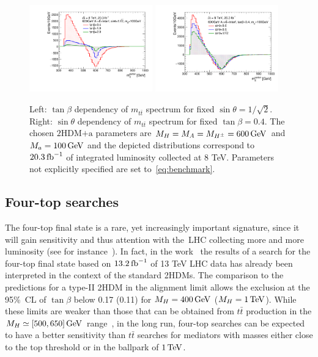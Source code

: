 \documentclass[a4paper, 11pt,notoc]{article}
\newcommand{\mA}{\ensuremath{M_{A}}\xspace}
\newcommand{\ma}{\ensuremath{M_{a}}\xspace}
\newcommand{\mH}{\ensuremath{M_{H}}\xspace}
\newcommand{\mHc}{\ensuremath{M_{H^{\pm}}}\xspace}
\newcommand{\hdma}{\ensuremath{\textrm{2HDM+a}}\xspace}
\begin{document}
\begin{figure}
\centering
\includegraphics[width=0.475\textwidth]{ttres_2HDMa_A_tanb.pdf} \quad 
\includegraphics[width=0.475\textwidth]{ttres_2HDMa_A_sinp.pdf}
\vspace{4mm}
\caption{Left: $\tan \beta$ dependency of $m_{t \bar t}$ spectrum for fixed $\sin \theta = 1/\sqrt{2}$. Right:  $\sin \theta$ dependency of $m_{t \bar t}$ spectrum for fixed $\tan \beta = 0.4$. The chosen \hdma parameters are $\mH=\mA=\mHc =600 \, {\rm GeV}$ and $\ma=100 \, {\rm GeV}$ and the depicted distributions correspond to $20.3 \, {\rm fb}^{-1}$ of integrated luminosity collected at 8 TeV. Parameters not explicitly specified are set to~\eqref{eq:benchmark}.}
\label{fig:ttres_2HDM_A}
\end{figure}

\subsection{Four-top searches}

The four-top final state is a rare, yet increasingly important signature, since it  will gain sensitivity and thus attention with the~LHC collecting more and more luminosity (see for instance~\cite{ATLAS-CONF-2016-104,Sirunyan:2017roi,Aaboud:2018xuw,Hajer:2015gka,Gori:2016zto,Alvarez:2016nrz}).   In fact, in the work~\cite{ATLAS-CONF-2016-104} the results of a search for the four-top final state based on $13.2 \, {\rm fb}^{-1}$ of 13 TeV LHC data has already been interpreted in the context of the standard 2HDMs. The comparison to the predictions for a type-II 2HDM in the alignment limit allows the exclusion at the 95\%~CL of $\tan \beta$  below 0.17 (0.11) for $\mH = 400 \, {\rm GeV}$ ($\mH = 1 \, {\rm TeV}$). While these limits are weaker than those that can be obtained from $t \bar t$ production in the $M_{H} \simeq [500, 650] \, {\rm GeV}$ range~\cite{Aaboud:2017hnm}, in the long run, four-top searches can be expected to have a better sensitivity than $t \bar t$ searches for mediators with  masses either close to the top threshold or  in the ballpark of $1 \, {\rm TeV}$. 
\end{document}

